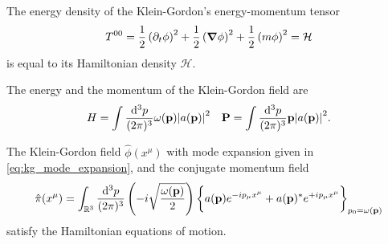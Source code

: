 \begin{lemma}\label{thm:kg_energy_density}
	The energy density of the Klein-Gordon's energy-momentum tensor
	\begin{equation}
		T^{00}
		=
		\frac{1}{2}
		\left(\partial_t\phi\right)^2
		+
		\frac{1}{2}
		\left(\grad\phi\right)^2
		+
		\frac{1}{2}
		\left(m\phi\right)^2
		=
		\mathcal{H}
		\label{thm:kg_hamiltonian}
	\end{equation}
	is equal to its Hamiltonian density $\mathcal{H}$.
\end{lemma}
\begin{lemma}\label{thm:kg_energy_momentum}
	The energy and the momentum of the Klein-Gordon field are
	\begin{align}
		H
		=
		\int\frac{\dd[3]{p}}{(2\pi)^3}
		\omega(\vb{p})\abs{a(\vb{p})}^2
		&&
		\vb{P}
		=
		\int\frac{\dd[3]{p}}{(2\pi)^3}
		\vb{p}\abs{a(\vb{p})}^2
		\label{eq:kg_energy_momentum}
		.
	\end{align}
\end{lemma}
\begin{lemma}\label{thm:kg_conjugate_momentum}
	The Klein-Gordon field $\hat\phi(x^\mu)$ with mode expansion given in \cref{eq:kg_mode_expansion}, and the conjugate momentum field
	\begin{equation}
		\hat\pi(x^\mu)
		=
		\int_{\mathbb{R}^3}\frac{\dd[3]{p}}{(2\pi)^3}
		\left(
			-i
			\sqrt{\frac{\omega(\vb{p})}{2}}
		\right)
		\biggl\{
			a(\vb{p})
			e^{-ip_\mu x^\mu}
			+
			a(\vb{p})^*
			e^{+ip_\mu x^\mu}
		\biggr\}_{p_0=\omega(\vb{p})}
		\label{eq:kg_conjugate_momentum}
	\end{equation}
	satisfy the Hamiltonian equations of motion.
\end{lemma}